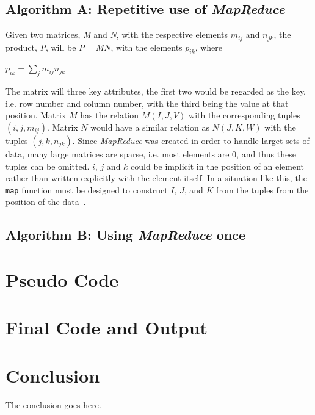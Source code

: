 \documentclass[10pt, conference]{IEEEtran}
\def\code#1{\texttt{#1}}
\begin{document}
\subsection{Algorithm A: Repetitive use of \emph{MapReduce}}
\label{Algorithm A}
Given two matrices, \emph{M} and \emph{N}, with the respective elements $m_{ij}$ and $n_{jk}$, the product, \emph{P}, will be $P=MN$, with the elements $p_{ik}$, where

\begin{center}
$p_{ik} = \sum_{j}^{} m_{ij}n_{jk}
$
\end{center}

The matrix will three key attributes, the first two would be regarded as the key, i.e. row number and column number, with the third being the value at that position. Matrix $M$ has the relation $M(I,J,V)$ with the corresponding tuples $(i,j,m_{ij})$. Matrix $N$ would have a similar relation as $N(J,K,W)$ with the tuples $(j,k,n_{jk})$. Since \emph{MapReduce} was created in order to handle larget sets of data, many large matrices are sparse, i.e. most elements are 0, and thus these tuples can be omitted. $i$, $j$ and $k$ could be implicit in the position of an element rather than written explicitly with the element itself. In a situation like this, the \code{map} function must be designed to construct $I$, $J$, and $K$ from the tuples from the position of the data~\cite{Book}.


\subsection{Algorithm B: Using \emph{MapReduce} once}
\label{Algorithm B}


\section{Pseudo Code}
\label{Pseudo Code}


\section{Final Code and Output}
\label{Final Code and Output}



\section{Conclusion}
\label{Conclusion}
The conclusion goes here.
\end{document}
